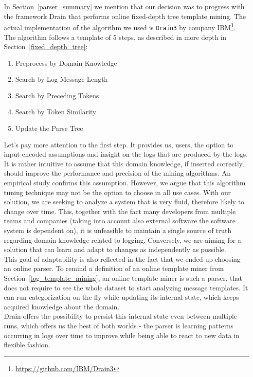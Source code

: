  \begin{figure}[!h] 
\end{figure}

In Section~\ref{parser_summary} we mention that our decision was to progress with the framework Drain \cite{drain2017} that performs online fixed-depth tree template mining. The actual implementation of the algorithm we used is \texttt{Drain3} by company IBM\footnote{\url{https://github.com/IBM/Drain3}}. The algorithm follows a template of 5 steps, as described in more depth in Section~\ref{fixed_depth_tree}:
\begin{enumerate}
    \item Preprocess by Domain Knowledge
    \item Search by Log Message Length
    \item Search by Preceding Tokens
    \item Search by Token Similarity
    \item Update the Parse Tree
\end{enumerate}

Let's pay more attention to the first step. It provides us, users, the option to input encoded assumptions and insight on the logs that are produced by the logs.
It is rather intuitive to assume that this domain knowledge, if inserted correctly, should improve the performance and precision of the mining algorithms. An empirical study \cite{he2016} confirms this assumption.
However, we argue that this algorithm tuning technique may not be the option to choose in all use cases. With our solution, we are seeking to analyze a system that is very fluid, therefore likely to change over time. This, together with the fact many developers from multiple teams and companies (taking into account also external software the software system is dependent on), it is unfeasible to maintain a single source of truth regarding domain knowledge related to logging. Conversely, we are aiming for a solution that can learn and adapt to changes as independently as possible.\\

This goal of adaptability is also reflected in the fact that we ended up choosing an online parser.
To remind a definition of an online template miner from Section~\ref{log_template_mining}, an online template miner is such a parser, that does not require to see the whole dataset to start analyzing message templates. It can run categorization on the fly while updating its internal state, which keeps acquired knowledge about the domain.\\
Drain offers the possibility to persist this internal state even between multiple runs, which offers us the best of both worlds - the parser is learning patterns occurring in logs over time to improve while being able to react to new data in flexible fashion.

